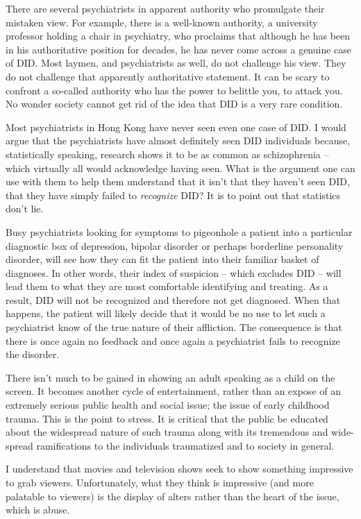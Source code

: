 \documentclass[]{book}
\begin{document}
There are several psychiatrists in apparent authority who promulgate their mistaken view. For example, there is a well-known authority, a university professor holding a chair in psychiatry, who proclaims that although he has been in his authoritative position for decades, he has never come across a genuine case of DID. Most laymen, and psychiatrists as well, do not challenge his view. They do not challenge that apparently authoritative statement. It can be scary to confront a so-called authority who has the power to belittle you, to attack you. No wonder society cannot get rid of the idea that DID is a very rare condition.

Most psychiatrists in Hong Kong have never seen even one case of DID. I would argue that the psychiatrists have almost definitely seen DID individuals because, statistically speaking, research shows it to be as common as schizophrenia -- which virtually all would acknowledge having seen. What is the argument one can use with them to help them understand that it isn't that they haven't seen DID, that they have simply failed to \emph{recognize} DID? It is to point out that statistics don't lie.

Busy psychiatrists looking for symptoms to pigeonhole a patient into a particular diagnostic box of depression, bipolar disorder or perhaps borderline personality disorder, will see how they can fit the patient into their familiar basket of diagnoses. In other words, their index of suspicion -- which excludes DID -- will lead them to what they are most comfortable identifying and treating. As a result, DID will not be recognized and therefore not get diagnosed. When that happens, the patient will likely decide that it would be no use to let such a psychiatrist know of the true nature of their affliction. The consequence is that there is once again no feedback and once again a psychiatrist fails to recognize the disorder.

There isn't much to be gained in showing an adult speaking as a child on the screen. It becomes another cycle of entertainment, rather than an expose of an extremely serious public health and social issue; the issue of early childhood trauma. This is the point to stress. It is critical that the public be educated about the widespread nature of such trauma along with its tremendous and wide-spread ramifications to the individuals traumatized and to society in general.

I understand that movies and television shows seek to show something impressive to grab viewers. Unfortunately, what they think is impressive (and more palatable to viewers) is the display of alters rather than the heart of the issue, which is abuse.
\end{document}
